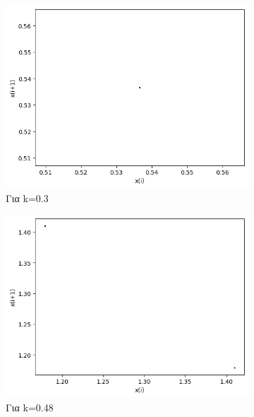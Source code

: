 \begin{figure}[h!]
	\centering
	\caption{Διαγράμματα της τιμής \(x_i\) με την τιμή \(x_{i+1}\) :}
	\begin{subfigure}[b]{0.25\textwidth}
		\centering
		\includegraphics[width=\textwidth]{LateX images/graphs q05/g3}
		\caption{Για k=0.3}
		\label{f:k27}
	\end{subfigure}
	\hfill
	\begin{subfigure}[b]{0.25\textwidth}
		\centering
		\includegraphics[width=\textwidth]{LateX images/graphs q05/g4}
		\caption{Για k=0.48}
		\label{f:k28}
	\end{subfigure}
	\hfill
	\begin{subfigure}[b]{0.25\textwidth}
		\centering

\end{subfigure}
\end{figure}
